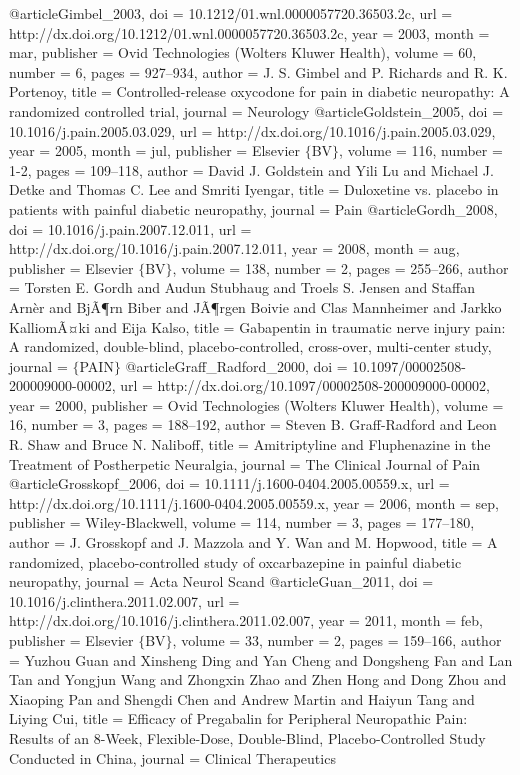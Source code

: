 @article{Gimbel_2003,
	doi = {10.1212/01.wnl.0000057720.36503.2c},
	url = {http://dx.doi.org/10.1212/01.wnl.0000057720.36503.2c},
	year = 2003,
	month = {mar},
	publisher = {Ovid Technologies (Wolters Kluwer Health)},
	volume = {60},
	number = {6},
	pages = {927--934},
	author = {J. S. Gimbel and P. Richards and R. K. Portenoy},
	title = {Controlled-release oxycodone for pain in diabetic neuropathy: A randomized controlled trial},
	journal = {Neurology}
}
@article{Goldstein_2005,
	doi = {10.1016/j.pain.2005.03.029},
	url = {http://dx.doi.org/10.1016/j.pain.2005.03.029},
	year = 2005,
	month = {jul},
	publisher = {Elsevier $\lbrace$BV$\rbrace$},
	volume = {116},
	number = {1-2},
	pages = {109--118},
	author = {David J. Goldstein and Yili Lu and Michael J. Detke and Thomas C. Lee and Smriti Iyengar},
	title = {Duloxetine vs. placebo in patients with painful diabetic neuropathy},
	journal = {Pain}
}
@article{Gordh_2008,
	doi = {10.1016/j.pain.2007.12.011},
	url = {http://dx.doi.org/10.1016/j.pain.2007.12.011},
	year = 2008,
	month = {aug},
	publisher = {Elsevier $\lbrace$BV$\rbrace$},
	volume = {138},
	number = {2},
	pages = {255--266},
	author = {Torsten E. Gordh and Audun Stubhaug and Troels S. Jensen and Staffan Arn{\`{e}}r and BjÃ¶rn Biber and JÃ¶rgen Boivie and Clas Mannheimer and Jarkko KalliomÃ¤ki and Eija Kalso},
	title = {Gabapentin in traumatic nerve injury pain: A randomized, double-blind, placebo-controlled, cross-over, multi-center study},
	journal = {$\lbrace$PAIN$\rbrace$}
}
@article{Graff_Radford_2000,
	doi = {10.1097/00002508-200009000-00002},
	url = {http://dx.doi.org/10.1097/00002508-200009000-00002},
	year = 2000,
	publisher = {Ovid Technologies (Wolters Kluwer Health)},
	volume = {16},
	number = {3},
	pages = {188--192},
	author = {Steven B. Graff-Radford and Leon R. Shaw and Bruce N. Naliboff},
	title = {Amitriptyline and Fluphenazine in the Treatment of Postherpetic Neuralgia},
	journal = {The Clinical Journal of Pain}
}
@article{Grosskopf_2006,
	doi = {10.1111/j.1600-0404.2005.00559.x},
	url = {http://dx.doi.org/10.1111/j.1600-0404.2005.00559.x},
	year = 2006,
	month = {sep},
	publisher = {Wiley-Blackwell},
	volume = {114},
	number = {3},
	pages = {177--180},
	author = {J. Grosskopf and J. Mazzola and Y. Wan and M. Hopwood},
	title = {A randomized, placebo-controlled study of oxcarbazepine in painful diabetic neuropathy},
	journal = {Acta Neurol Scand}
}
@article{Guan_2011,
	doi = {10.1016/j.clinthera.2011.02.007},
	url = {http://dx.doi.org/10.1016/j.clinthera.2011.02.007},
	year = 2011,
	month = {feb},
	publisher = {Elsevier $\lbrace$BV$\rbrace$},
	volume = {33},
	number = {2},
	pages = {159--166},
	author = {Yuzhou Guan and Xinsheng Ding and Yan Cheng and Dongsheng Fan and Lan Tan and Yongjun Wang and Zhongxin Zhao and Zhen Hong and Dong Zhou and Xiaoping Pan and Shengdi Chen and Andrew Martin and Haiyun Tang and Liying Cui},
	title = {Efficacy of Pregabalin for Peripheral Neuropathic Pain: Results of an 8-Week, Flexible-Dose, Double-Blind, Placebo-Controlled Study Conducted in China},
	journal = {Clinical Therapeutics}
}
